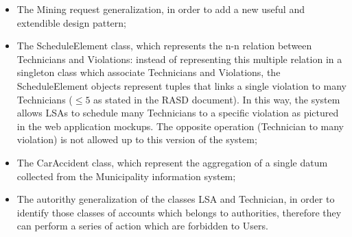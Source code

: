 \begin{itemize}
    \item The Mining request generalization, in order to add a new useful and extendible design pattern;
    \item The ScheduleElement class, which represents the n-n relation between Technicians and Violations: instead of representing this multiple relation in a singleton class which associate Technicians and Violations, the ScheduleElement objects represent tuples that links a single violation to many Technicians ($\le 5$ as stated in the RASD document). In this way, the system allows LSAs to schedule many Technicians to a specific violation as pictured in the web application mockups. The opposite operation (Technician to many violation) is not allowed up to this version of the system;
    \item The CarAccident class, which represent the aggregation of a single datum collected from the Municipality information system;
    \item The autorithy generalization of the classes LSA and Technician, in order to identify those classes of accounts which belongs to authorities, therefore they can perform a series of action which are forbidden to Users. 
\end{itemize}
